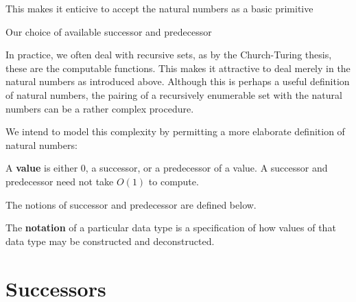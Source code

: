 This makes it enticive to accept the natural numbers as a basic primitive


Our choice of available successor and predecessor

In practice, we often deal with recursive sets, as by the Church-Turing thesis,
these are  the computable functions. This makes it attractive to deal merely in
the natural numbers as introduced above. Although this is perhaps a useful
definition of natural numbers, the pairing of a recursively enumerable set with
the natural numbers can be a rather complex procedure.

We intend to model this complexity by permitting a more elaborate definition of
natural numbers:

\begin{notion}

A \textbf{value} is either $0$, a successor, or a predecessor of a value. A
successor and predecessor need not take $O(1)$ to compute.

\end{notion}

The notions of successor and predecessor are defined below.



\begin{definition}

The \textbf{notation} of a particular data type is a specification of how
values of that data type may be constructed and deconstructed.

\end{definition}

\section{Successors}





